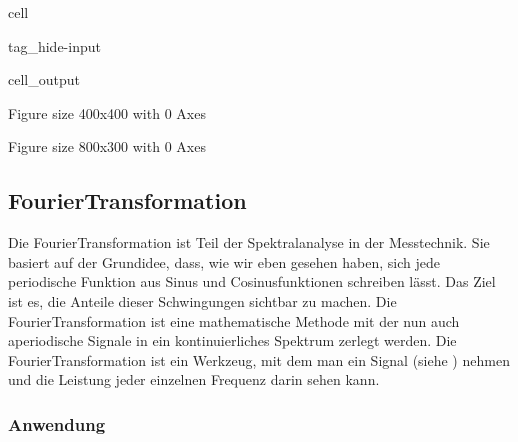 \documentclass[letterpaper,10pt,english]{jupyterBook}
\begin{document}
\begin{sphinxuseclass}{cell}
\begin{sphinxuseclass}{tag_hide-input}\begin{sphinxVerbatimOutput}

\begin{sphinxuseclass}{cell_output}
\begin{sphinxVerbatim}[commandchars=\\\{\}]
\PYGZlt{}Figure size 400x400 with 0 Axes\PYGZgt{}
\end{sphinxVerbatim}

\begin{sphinxVerbatim}[commandchars=\\\{\}]
\PYGZlt{}Figure size 800x300 with 0 Axes\PYGZgt{}
\end{sphinxVerbatim}

\noindent{}

\end{sphinxuseclass}\end{sphinxVerbatimOutput}

\end{sphinxuseclass}
\end{sphinxuseclass}

\subsection{Fourier\sphinxhyphen{}Transformation}
\label{\detokenize{content/3_FourierAnalyse:fourier-transformation}}
\sphinxAtStartPar


\sphinxAtStartPar
Die Fourier\sphinxhyphen{}Transformation ist Teil der Spektralanalyse in der Messtechnik. Sie basiert auf der Grundidee, dass, wie wir eben gesehen haben, sich jede periodische Funktion aus Sinus\sphinxhyphen{} und Cosinusfunktionen schreiben lässt. Das Ziel ist es, die Anteile dieser Schwingungen sichtbar zu machen. Die Fourier\sphinxhyphen{}Transformation ist eine mathematische Methode mit der nun auch aperiodische Signale in ein kontinuierliches Spektrum zerlegt werden. Die Fourier\sphinxhyphen{}Transformation ist ein Werkzeug, mit dem man ein Signal (siehe {\hyperref[\detokenize{content/3_Messsignale::doc}]{}}) nehmen und die Leistung jeder einzelnen Frequenz darin sehen kann.


\subsubsection{Anwendung}
\label{\detokenize{content/3_FourierAnalyse:anwendung}}
\sphinxAtStartPar
\end{document}

